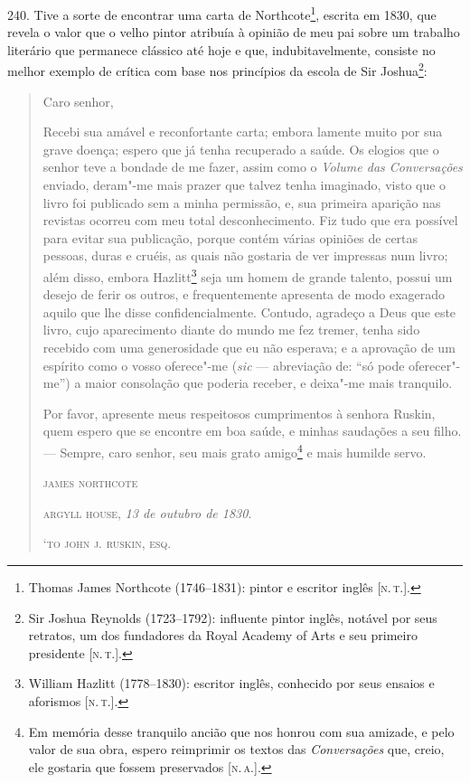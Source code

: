 240. Tive a sorte de encontrar uma carta de Northcote\footnote{Thomas
  James Northcote (1746--1831): pintor e escritor inglês {[}\textsc{n.\,t.}{]}.},
escrita em 1830, que revela o valor que o velho pintor atribuía à
opinião de meu pai sobre um trabalho literário que permanece clássico
até hoje e que, indubitavelmente, consiste no melhor exemplo de crítica
com base nos princípios da escola de Sir Joshua\footnote{Sir Joshua
  Reynolds (1723--1792): influente pintor inglês, notável por seus
  retratos, um dos fundadores da Royal Academy of Arts e seu primeiro
  presidente {[}\textsc{n.\,t.}{]}.}: %

\begin{quote}
Caro senhor,

Recebi sua amável e reconfortante carta; embora
lamente muito por sua grave doença; espero que já tenha recuperado a
saúde. Os elogios que o senhor teve a bondade de me fazer, assim como o
\emph{Volume das Conversações} enviado, deram"-me mais prazer que talvez
tenha imaginado, visto que o livro foi publicado sem a minha permissão,
e, sua primeira aparição nas revistas ocorreu com meu total
desconhecimento. Fiz tudo que era possível para evitar sua publicação,
porque contém várias opiniões de certas pessoas, duras e cruéis, as
quais não gostaria de ver impressas num livro; além disso, embora
Hazlitt\footnote{William Hazlitt (1778--1830): escritor inglês, conhecido
  por seus ensaios e aforismos {[}\textsc{n.\,t.}{]}.} seja um homem de grande
talento, possui um desejo de ferir os outros, e frequentemente apresenta
de modo exagerado aquilo que lhe disse confidencialmente. Contudo,
agradeço a Deus que este livro, cujo aparecimento diante do mundo me fez
tremer, tenha sido recebido com uma generosidade que eu não esperava; e
a aprovação de um espírito como o vosso oferece"-me (\emph{sic} ---
abreviação de: ``só pode oferecer"-me'') a maior consolação que poderia
receber, e deixa"-me mais tranquilo.

Por favor, apresente meus respeitosos cumprimentos à senhora Ruskin,
quem espero que se encontre em boa saúde, e minhas saudações a seu
filho. --- Sempre, caro senhor, seu mais grato amigo\footnote{Em memória
  desse tranquilo ancião que nos honrou com sua amizade, e pelo valor de
  sua obra, espero reimprimir os textos das \emph{Conversações} que,
  creio, ele gostaria que fossem preservados {[}\textsc{n.\,a.}{]}.} e mais
humilde servo.

\bigskip

\hfill\textsc{james northcote}

\hfill\textsc{argyll house}, \emph{13 de outubro de 1830}.

\hfill\textsc{`to john j. ruskin, esq.}
\end{quote}

